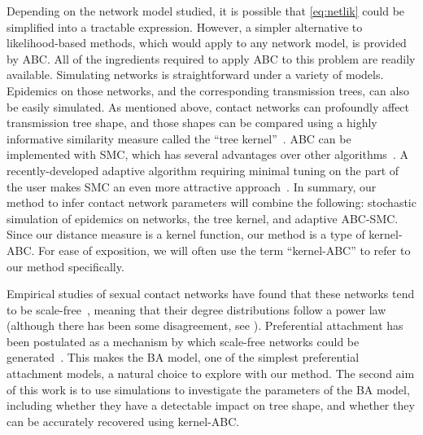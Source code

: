Depending on the network model studied, it is possible that \cref{eq:netlik}
could be simplified into a tractable expression. However, a simpler alternative
to likelihood-based methods, which would apply to any network model, is
provided by \gls{ABC}. All of the ingredients required to apply \gls{ABC} to
this problem are readily available. Simulating networks is straightforward
under a variety of models. Epidemics on those networks, and the corresponding
transmission trees, can also be easily simulated. As mentioned above, contact
networks can profoundly affect transmission tree shape, and those shapes can be
compared using a highly informative similarity measure called the ``tree
kernel''~\autocite{poon2013mapping}. \Gls{ABC} can be implemented with
\gls{SMC}, which has several advantages over other
algorithms~\autocite{mckinley2009inference}. A recently-developed adaptive
algorithm requiring minimal tuning on the part of the user makes \gls{SMC} an
even more attractive approach~\autocite{del2012adaptive}. In summary, our
method to infer contact network parameters will combine the following:
stochastic simulation of epidemics on networks, the tree kernel, and adaptive
\gls{ABC}-\gls{SMC}. Since our distance measure is a kernel function, our
method is a type of kernel-\gls{ABC}. For ease of exposition, we will often use
the term ``kernel-\gls{ABC}'' to refer to our method specifically.

Empirical studies of sexual contact networks have found that these networks
tend to be scale-free~\autocite{colgate1989risk, liljeros2001web,
schneeberger2004scale}, meaning that their degree distributions follow a power
law (although there has been some disagreement, see
\autocite{handcock2004likelihood, bansal2007individual}). Preferential
attachment has been postulated as a mechanism by which scale-free networks
could be generated~\autocite{barabasi1999emergence}. This makes the \gls{BA}
model, one of the simplest preferential attachment models, a natural choice to
explore with our method. The second aim of this work is to use simulations to
investigate the parameters of the \gls{BA} model, including whether they have a
detectable impact on tree shape, and whether they can be accurately recovered
using kernel-\gls{ABC}.

